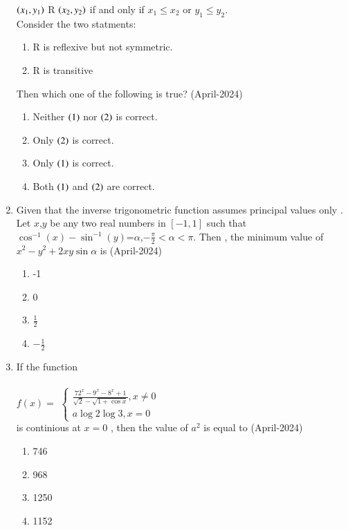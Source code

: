 \documentclass[journal,12pt,onecolumn]{IEEEtran}
\theoremstyle{remark}
\begin{document}
\begin{enumerate}
$\left(x_1,y_1\right)$ R $\left(x_2,y_2\right)$ if and only if $x_1\leq x_2$ or $y_1\leq y_2$.\\
Consider the two statments:
\begin{enumerate}
\item R is reflexive but not symmetric.
\item R is transitive
\end{enumerate}
Then which one of the following is true?
\hfill{(April-2024)}
\begin{multicols}{2}
\begin{enumerate}
\item Neither $\left(1\right)$ nor $\left(2\right)$ is correct. 
\item Only $\left(2\right)$ is correct.
\item Only $\left(1\right)$ is correct. 
\item Both $\left(1\right)$ and $\left(2\right)$ are correct.
\end{enumerate}
\end{multicols}
\item Given that the inverse trigonometric function assumes principal values only . Let $x$,$y$ be any two real numbers in $[-1,1]$ such that  $\cos^{-1}(x)-\sin^{-1}(y)$=$\alpha $,$-\frac{\pi}{2}<\alpha<\pi$.
Then , the minimum value of $x^2-y^2+2xy\sin{\alpha}$ is 
\hfill{(April-2024)}
\begin{multicols}{2}
\begin{enumerate}
\item -1
\item 0
\item $\frac{1}{2}$
\item $-\frac{1}{2}$
\end{enumerate}
\end{multicols}
\item If the function\\
\\$f(x)=$
$ \begin{cases}
   \frac{72^x-9^x-8^x+1}{\sqrt{2}-\sqrt{1+\cos{x}}},x \neq 0\\
   a\log2\log3,x=0
\end{cases} $ \\
is continious at $x=0$ , then the value of $a^2$ is equal to 
\hfill{(April-2024)}
\begin{multicols}{2}
\begin{enumerate}
\item 746
\item 968 
\item 1250
\item 1152

\end{enumerate}
\end{multicols}
\end{enumerate}
\end{document}
